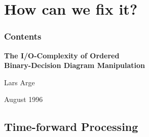 \documentclass[english, aspectratio=169]{beamer}
\begin{document}
\section{How can we fix it?}

\begin{frame}{}
  \frametitle{Contents}
  \tableofcontents[currentsection]
\end{frame}

\begin{frame}{}
  \begin{center}
    {\LARGE\bf The I/O-Complexity of Ordered\\Binary-Decision Diagram Manipulation}

    Lars Arge


    {\footnotesize August 1996}
  \end{center}
\end{frame}

\subsection{Time-forward Processing}
\end{document}
